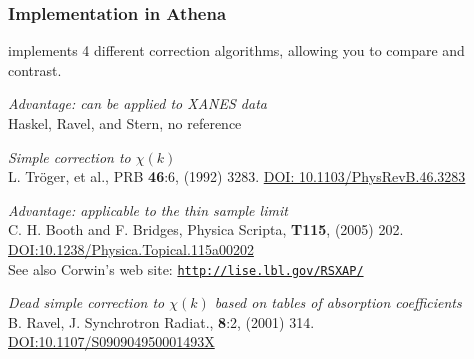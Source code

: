 \documentclass[10pt, xcolor=x11names, compress]{beamer}
\begin{document}
\begin{frame}
  \frametitle{Implementation in Athena}
  \small
  {\athena} implements 4 different correction algorithms, allowing you
  to compare and contrast.

  \medskip

  \begin{description}[Tr\"oger]
  \item[Fluo] \textit{Advantage: can be applied to XANES data}\\
    Haskel, Ravel, and Stern, no reference
  \item[Tr\"oger] \textit{Simple correction to $\chi(k)$}\\L. Tr\"oger, et
    al., PRB \textbf{46}:6, (1992) 3283.
    \href{http://dx.doi.org/10.1103/PhysRevB.46.3283}{\color{Blue2}DOI:
      10.1103/PhysRevB.46.3283}
  \item[Booth] \textit{Advantage: applicable to the thin sample limit}\\
    C. H. Booth and F. Bridges, Physica Scripta, \textbf{T115}, (2005)
    202.  \href{http://dx.doi.org/10.1238/Physica.Topical.115a00202}
    {\color{Blue2}DOI:10.1238/Physica.Topical.115a00202}\\ See also
    Corwin's web site: \href{http://lise.lbl.gov/RSXAP/}
    {\color{Blue2}\texttt{http://lise.lbl.gov/RSXAP/}}
  \item[Atoms] \textit{Dead simple correction to $\chi(k)$ based on
      tables of absorption coefficients}\\
    B. Ravel, J. Synchrotron Radiat., \textbf{8}:2, (2001) 314. 
    \href{http://dx.doi.org/10.1107/S090904950001493X}
    {\color{Blue2}DOI:10.1107/S090904950001493X}
  \end{description}
\end{frame}
\end{document}
